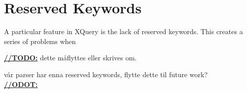 \section{Reserved Keywords}
\label{sect:impl:reserved_keywords}
A particular feature in XQuery is the lack of reserved keywords. This creates a series of problems when 


\underline{\textbf{\LARGE //TODO:}} dette m\aa flyttes eller skrives om.



v\aa r parser har enna reserved keywords, flytte dette til future work? \\
\underline{\textbf{\LARGE //ODOT:}} 